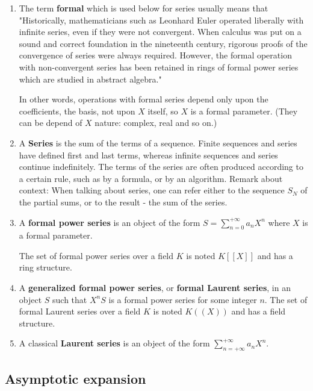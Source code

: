 \documentclass[a4paper]{article}
\begin{document}
        \begin{enumerate}
           \item The term \textbf{formal} which is used below for series usually means that "Historically, mathematicians such as Leonhard Euler operated liberally with infinite series, even if they were not
convergent. When calculus was put on a sound and correct foundation in the nineteenth century, rigorous proofs of
the convergence of series were always required. However, the formal operation with non-convergent series has been
retained in rings of formal power series which are studied in abstract algebra."

In other words, operations with formal series depend only upon the coefficients, the basis, not upon $X$ itself, so $X$ is a formal parameter. (They can be depend of $X$ nature: complex, real and so on.)

            \item A \textbf{Series} is the sum of the terms of a sequence. Finite sequences and series have defined first and last terms,
whereas infinite sequences and series continue indefinitely. The terms of the series are often produced according to a certain rule, such as by a formula, or by an algorithm. Remark about context:
When talking about series, one can refer either to the sequence ${S_N}$ of the partial sums, or to the result - the sum of the series.
            
            \item A \textbf{formal power series} is an object of the form $S = \sum_{n=0}^{+\infty} a_n X^n$ where $X$ is a formal parameter.
            
            The set of formal power series over a field $K$ is noted $K[[X]]$ and has a ring structure.
            
            \item  A \textbf{generalized formal power series}, or \textbf{formal Laurent series}, in an object $S$ such that $X^n S$ is a formal power series for some integer $n$. The set of formal Laurent series over a field $K$ is noted $K((X))$ and has a field structure.
            
            \item A classical \textbf{Laurent series} is an object of the form $\sum_{n=+\infty}^{+\infty} a_n X^n$.
            
        \end{enumerate}
        
   \subsection{Asymptotic expansion}
   
\end{document}
